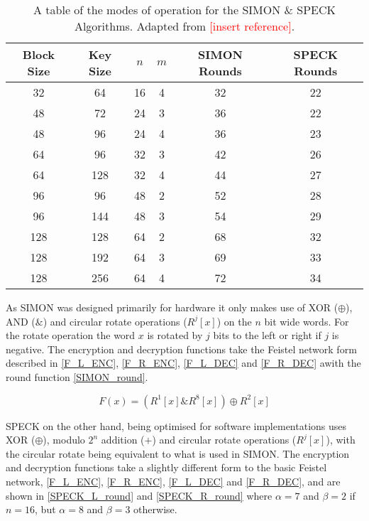 \documentclass[12pt,twoside,a4paper]{report}
\begin{document}
        \begin{table}[H]
        \centering
        \begin{tabular}{||c|c|c|c|c|c||}
            \hline \hline
            Block Size & Key Size & $n$ & $m$ & SIMON Rounds & SPECK Rounds \\
            \hline \hline
            32 & 64 & 16 & 4 & 32 & 22 \\
            \hline
            48 & 72 & 24 & 3 & 36 & 22 \\
            48 & 96 & 24 & 4 & 36 & 23 \\
            \hline
            64 & 96 & 32 & 3 & 42 & 26 \\
            64 & 128 & 32 & 4 & 44 & 27 \\
            \hline
            96 & 96 & 48 & 2 & 52 & 28 \\
            96 & 144 & 48 & 3 & 54 & 29 \\
            \hline
            128 & 128 & 64 & 2 & 68 & 32 \\
            128 & 192 & 64 & 3 & 69 & 33 \\
            128 & 256 & 64 & 4 & 72 & 34 \\
            \hline \hline
        \end{tabular}
        \caption{A table of the modes of operation for the SIMON \& SPECK Algorithms. Adapted from \textcolor{red}{[insert reference]}.}
        \label{table:S+S}
        \end{table}
    
    As SIMON was designed primarily for hardware it only makes use of XOR ($\oplus$), AND ($\&$) and circular rotate operations ($R^j[x]$) on the $n$ bit wide words. For the rotate operation the word $x$ is rotated by $j$ bits to the left or right if $j$ is negative. The encryption and decryption functions take the Feistel network form described in \autoref{F_L_ENC}, \ref{F_R_ENC}, \ref{F_L_DEC} and \ref{F_R_DEC} awith the round function \autoref{SIMON_round}.
    
    \begin{equation}
    \label{SIMON_round}
    F(x) = (R^1[x]\&R^8[x]) \oplus R^2[x]
    \end{equation}
    
    SPECK on the other hand, being optimised for software implementations uses XOR ($\oplus$), modulo $2^n$ addition ($+$) and circular rotate operations ($R^j[x]$), with the circular rotate being equivalent to what is used in SIMON. The encryption and decryption functions take a slightly different form to the basic Feistel network, \autoref{F_L_ENC}, \ref{F_R_ENC}, \ref{F_L_DEC} and \ref{F_R_DEC}, and are shown in \autoref{SPECK_L_round} and \ref{SPECK_R_round} where $\alpha = 7$ and $\beta = 2$ if $n = 16$, but $\alpha = 8$ and $\beta = 3$ otherwise.
    
\end{document}
